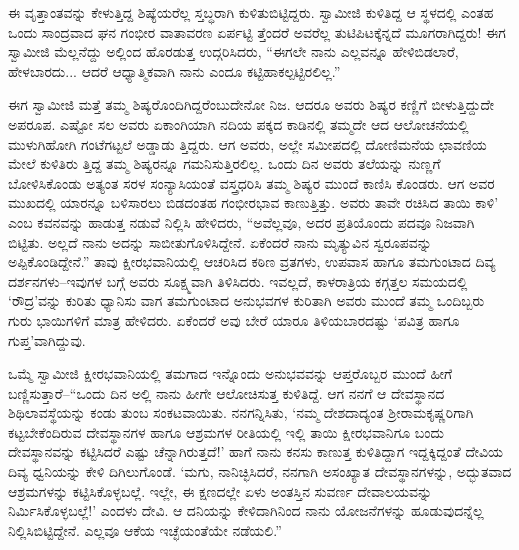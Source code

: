 ಈ ವೃತ್ತಾಂತವನ್ನು ಕೇಳುತ್ತಿದ್ದ ಶಿಷ್ಯೆಯರೆಲ್ಲ ಸ್ತಬ್ಧರಾಗಿ ಕುಳಿತುಬಿಟ್ಟಿದ್ದರು. ಸ್ವಾಮೀಜಿ ಕುಳಿತಿದ್ದ ಆ ಸ್ಥಳದಲ್ಲಿ ಎಂತಹ ಒಂದು ಸಾಂದ್ರವಾದ ಘನ ಗಂಭೀರ ವಾತಾವರಣ ಏರ್ಪಟ್ಟಿ ತ್ತೆಂದರೆ ಅವರೆಲ್ಲ ತುಟಿಪಿಟಕ್ಕೆನ್ನದೆ ಮೂಗರಾಗಿದ್ದರು! ಈಗ ಸ್ವಾಮೀಜಿ ಮೆಲ್ಲನೆದ್ದು ಅಲ್ಲಿಂದ ಹೊರಡುತ್ತ ಉದ್ಗರಿಸಿದರು, “ಈಗಲೇ ನಾನು ಎಲ್ಲವನ್ನೂ ಹೇಳಿಬಿಡಲಾರೆ, ಹೇಳಬಾರದು... ಆದರೆ ಆಧ್ಯಾತ್ಮಿಕವಾಗಿ ನಾನು ಎಂದೂ ಕಟ್ಟಿಹಾಕಲ್ಪಟ್ಟಿರಲಿಲ್ಲ.”

ಈಗ ಸ್ವಾಮೀಜಿ ಮತ್ತೆ ತಮ್ಮ ಶಿಷ್ಯರೊಂದಿಗಿದ್ದರೆಂಬುದೇನೋ ನಿಜ. ಆದರೂ ಅವರು ಶಿಷ್ಯರ ಕಣ್ಣಿಗೆ ಬೀಳುತ್ತಿದ್ದುದೇ ಅಪರೂಪ. ಎಷ್ಟೋ ಸಲ ಅವರು ಏಕಾಂಗಿಯಾಗಿ ನದಿಯ ಪಕ್ಕದ ಕಾಡಿನಲ್ಲಿ ತಮ್ಮದೇ ಆದ ಆಲೋಚನೆಯಲ್ಲಿ ಮುಳುಗಿಹೋಗಿ ಗಂಟೆಗಟ್ಟಲೆ ಅಡ್ಡಾಡು ತ್ತಿದ್ದರು. ಆಗ ಅವರು, ಅಲ್ಲೇ ಸಮೀಪದಲ್ಲಿ ದೋಣಿಮನೆಯ ಛಾವಣಿಯ ಮೇಲೆ ಕುಳಿತಿರು ತ್ತಿದ್ದ ತಮ್ಮ ಶಿಷ್ಯರನ್ನೂ ಗಮನಿಸುತ್ತಿರಲಿಲ್ಲ. ಒಂದು ದಿನ ಅವರು ತಲೆಯನ್ನು ನುಣ್ಣಗೆ ಬೋಳಿಸಿಕೊಂಡು ಅತ್ಯಂತ ಸರಳ ಸಂನ್ಯಾಸಿಯಂತೆ ವಸ್ತ್ರಧರಿಸಿ ತಮ್ಮ ಶಿಷ್ಯರ ಮುಂದೆ ಕಾಣಿಸಿ ಕೊಂಡರು. ಆಗ ಅವರ ಮುಖದಲ್ಲಿ ಯಾರನ್ನೂ ಬಳಿಸಾರಲು ಬಿಡದಂತಹ ಗಂಭೀರಭಾವ ಕಾಣುತ್ತಿತ್ತು. ಅವರು ತಾವೇ ರಚಿಸಿದ ತಾಯಿ ಕಾಳಿ’ ಎಂಬ ಕವನವನ್ನು ಹಾಡುತ್ತ ನಡುವೆ ನಿಲ್ಲಿಸಿ ಹೇಳಿದರು, “ಅವೆಲ್ಲವೂ, ಅದರ ಪ್ರತಿಯೊಂದು ಪದವೂ ನಿಜವಾಗಿ ಬಿಟ್ಟಿತು. ಅಲ್ಲದೆ ನಾನು ಅದನ್ನು ಸಾಬೀತುಗೊಳಿಸಿದ್ದೇನೆ. ಏಕೆಂದರೆ ನಾನು ಮೃತ್ಯುವಿನ ಸ್ವರೂಪವನ್ನು ಅಪ್ಪಿಕೊಂಡಿದ್ದೇನೆ.” ತಾವು ಕ್ಷೀರಭವಾನಿಯಲ್ಲಿ ಆಚರಿಸಿದ ಕಠಿಣ ವ್ರತಗಳು, ಉಪವಾಸ ಹಾಗೂ ತಮಗುಂಟಾದ ದಿವ್ಯ ದರ್ಶನಗಳು–ಇವುಗಳ ಬಗ್ಗೆ ಅವರು ಸೂಕ್ಷ್ಮವಾಗಿ ತಿಳಿಸಿದರು. ಇವಲ್ಲದೆ, ಕಾಳರಾತ್ರಿಯ ಕಗ್ಗತ್ತಲ ಸಮಯದಲ್ಲಿ ‘ರೌದ್ರ’ವನ್ನು ಕುರಿತು ಧ್ಯಾನಿಸು ವಾಗ ತಮಗುಂಟಾದ ಅನುಭವಗಳ ಕುರಿತಾಗಿ ಅವರು ಮುಂದೆ ತಮ್ಮ ಒಂದಿಬ್ಬರು ಗುರು ಭಾಯಿಗಳಿಗೆ ಮಾತ್ರ ಹೇಳಿದರು. ಏಕೆಂದರೆ ಅವು ಬೇರೆ ಯಾರೂ ತಿಳಿಯಬಾರದಷ್ಟು ‘ಪವಿತ್ರ ಹಾಗೂ ಗುಪ್ತ’ವಾಗಿದ್ದುವು.

ಒಮ್ಮೆ ಸ್ವಾಮೀಜಿ ಕ್ಷೀರಭವಾನಿಯಲ್ಲಿ ತಮಗಾದ ಇನ್ನೊಂದು ಅನುಭವವನ್ನು ಆಪ್ತರೊಬ್ಬರ ಮುಂದೆ ಹೀಗೆ ಬಣ್ಣಿಸುತ್ತಾರೆ–“ಒಂದು ದಿನ ಅಲ್ಲಿ ನಾನು ಹೀಗೇ ಆಲೋಚಿಸುತ್ತ ಕುಳಿತಿದ್ದೆ. ಆಗ ನನಗೆ ಆ ದೇವಸ್ಥಾನದ ಶಿಥಿಲಾವಸ್ಥೆಯನ್ನು ಕಂಡು ತುಂಬ ಸಂಕಟವಾಯಿತು. ನನಗನ್ನಿಸಿತು, ‘ನಮ್ಮ ದೇಶದಾದ್ಯಂತ ಶ್ರೀರಾಮಕೃಷ್ಣರಿಗಾಗಿ ಕಟ್ಟಬೇಕೆಂದಿರುವ ದೇವಸ್ಥಾನಗಳ ಹಾಗೂ ಆಶ್ರಮಗಳ ರೀತಿಯಲ್ಲಿ ಇಲ್ಲಿ ತಾಯಿ ಕ್ಷೀರಭವಾನಿಗೂ ಬಂದು ದೇವಸ್ಥಾನವನ್ನು ಕಟ್ಟಿಸಿದರೆ ಎಷ್ಟು ಚೆನ್ನಾಗಿರುತ್ತದೆ!’ ಹಾಗೆ ನಾನು ಕನಸು ಕಾಣುತ್ತ ಕುಳಿತಿದ್ದಾಗ ಇದ್ದಕ್ಕಿದ್ದಂತೆ ದೇವಿಯ ದಿವ್ಯ ಧ್ವನಿಯನ್ನು ಕೇಳಿ ದಿಗಿಲುಗೊಂಡೆ. ‘ಮಗು, ನಾನಿಚ್ಛಿಸಿದರೆ, ನನಗಾಗಿ ಅಸಂಖ್ಯಾತ ದೇವಸ್ಥಾನಗಳನ್ನು, ಅದ್ಭುತವಾದ ಆಶ್ರಮಗಳನ್ನು ಕಟ್ಟಿಸಿಕೊಳ್ಳಬಲ್ಲೆ. ಇಲ್ಲೇ, ಈ ಕ್ಷಣದಲ್ಲೇ ಏಳು ಅಂತಸ್ತಿನ ಸುವರ್ಣ ದೇವಾಲಯವನ್ನು ನಿರ್ಮಿಸಿಕೊಳ್ಳಬಲ್ಲೆ!’ ಎಂದಳು ದೇವಿ. ಆ ದನಿಯನ್ನು ಕೇಳಿದಾಗಿನಿಂದ ನಾನು ಯೋಜನೆಗಳನ್ನು ಹೂಡುವುದನ್ನೆಲ್ಲ ನಿಲ್ಲಿಸಿಬಿಟ್ಟಿದ್ದೇನೆ. ಎಲ್ಲವೂ ಆಕೆಯ ಇಚ್ಛೆಯಂತೆಯೇ ನಡೆಯಲಿ.”

